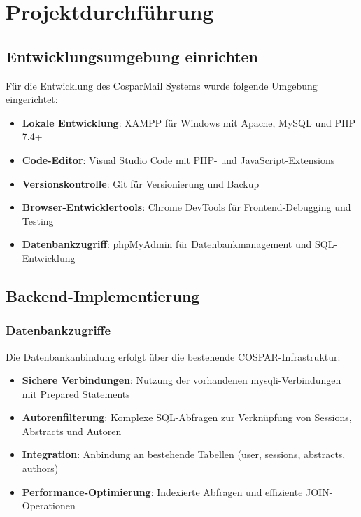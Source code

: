 \documentclass[11pt,a4paper]{article}
\begin{document}
\newpage
\section{Projektdurchführung}

\subsection{Entwicklungsumgebung einrichten}
Für die Entwicklung des CosparMail Systems wurde folgende Umgebung eingerichtet:
\begin{itemize}
    \item \textbf{Lokale Entwicklung}: XAMPP für Windows mit Apache, MySQL und PHP 7.4+
    \item \textbf{Code-Editor}: Visual Studio Code mit PHP- und JavaScript-Extensions
    \item \textbf{Versionskontrolle}: Git für Versionierung und Backup
    \item \textbf{Browser-Entwicklertools}: Chrome DevTools für Frontend-Debugging und Testing
    \item \textbf{Datenbankzugriff}: phpMyAdmin für Datenbankmanagement und SQL-Entwicklung
\end{itemize}

\subsection{Backend-Implementierung}

\subsubsection{Datenbankzugriffe}
Die Datenbankanbindung erfolgt über die bestehende COSPAR-Infrastruktur:
\begin{itemize}
    \item \textbf{Sichere Verbindungen}: Nutzung der vorhandenen mysqli-Verbindungen mit Prepared Statements
    \item \textbf{Autorenfilterung}: Komplexe SQL-Abfragen zur Verknüpfung von Sessions, Abstracts und Autoren
    \item \textbf{Integration}: Anbindung an bestehende Tabellen (user, sessions, abstracts, authors)
    \item \textbf{Performance-Optimierung}: Indexierte Abfragen und effiziente JOIN-Operationen
\end{itemize}
\end{document}
